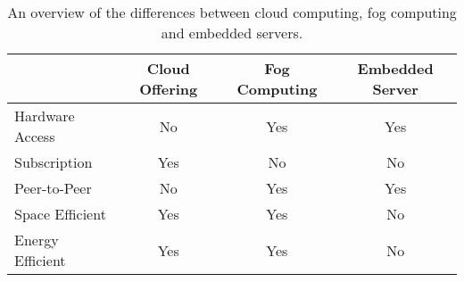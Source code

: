 \begin{table}[]
	\centering
	\begin{tabular}{@{}lccc@{}}
		\toprule
		                 & \textbf{Cloud Offering} & \textbf{Fog Computing} & \textbf{Embedded Server} \\ \midrule
		Hardware Access  & No                      & Yes                    & Yes                      \\
		Subscription     & Yes                     & No                     & No                       \\
		Peer-to-Peer     & No\footnotemark         & Yes                    & Yes                      \\
		Space Efficient  & Yes                     & Yes                    & No                       \\
		Energy Efficient & Yes                     & Yes                    & No                       \\ \bottomrule
	\end{tabular}
	\caption{An overview of the differences between cloud computing, fog computing and embedded servers.}%
	\label{tab:alternatives}
\end{table}


